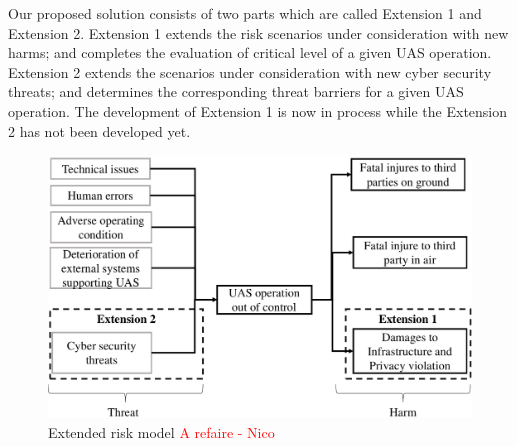 \documentclass[a4paper, 10, conference]{ieeeconf}  %
\begin{document}
Our proposed solution consists of two parts which are called Extension 1 and Extension 2. Extension 1 extends the risk scenarios under consideration with new harms; and completes the evaluation of critical level of a given UAS operation. Extension 2 extends the scenarios under consideration with new cyber security threats; and determines the corresponding threat barriers for a given UAS operation. The development of Extension 1 is now in process while the Extension 2 has not been developed yet.
\begin{figure}[!ht]
	\centering
	\includegraphics[width=3.3 in]{image/extended_SORA.pdf}
	\caption{Extended risk model \textcolor{red}{A refaire - Nico}}
	\label{figure: Extended risk model}
\end{figure}
\end{document}

